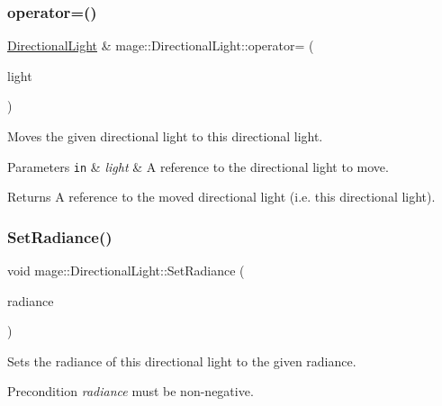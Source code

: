 \subsubsection{\texorpdfstring{operator=()}{operator=()}\hspace{0.1cm}{\footnotesize\ttfamily [2/2]}}
{\footnotesize\ttfamily \hyperlink{classmage_1_1_directional_light}{Directional\+Light} \& mage\+::\+Directional\+Light\+::operator= (\begin{DoxyParamCaption}\item[{\hyperlink{classmage_1_1_directional_light}{Directional\+Light} \&\&}]{light }\end{DoxyParamCaption})\hspace{0.3cm}{\ttfamily [default]}}

Moves the given directional light to this directional light.


\begin{DoxyParams}[1]{Parameters}
\mbox{\tt in}  & {\em light} & A reference to the directional light to move. \\
\hline
\end{DoxyParams}
\begin{DoxyReturn}{Returns}
A reference to the moved directional light (i.\+e. this directional light). 
\end{DoxyReturn}
\hypertarget{classmage_1_1_directional_light_ac8b63948d393696ca8745c799328be84}{}\label{classmage_1_1_directional_light_ac8b63948d393696ca8745c799328be84} 
\subsubsection{\texorpdfstring{Set\+Radiance()}{SetRadiance()}}
{\footnotesize\ttfamily void mage\+::\+Directional\+Light\+::\+Set\+Radiance (\begin{DoxyParamCaption}\item[{\hyperlink{namespacemage_aa97e833b45f06d60a0a9c4fc22ae02c0}{F32}}]{radiance }\end{DoxyParamCaption})\hspace{0.3cm}{\ttfamily [noexcept]}}

Sets the radiance of this directional light to the given radiance.

\begin{DoxyPrecond}{Precondition}
{\itshape radiance} must be non-\/negative. 
\end{DoxyPrecond}

